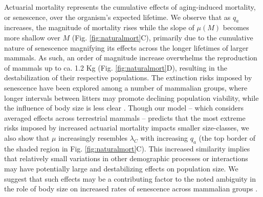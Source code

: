 \documentclass[11pt]{article}
\begin{document}
Actuarial mortality represents the cumulative effects of aging-induced mortality, or senescence, over the organism's expected lifetime. 
We observe that as $q_a$ increases, the magnitude of mortality rises while the slope of $\mu(M)$ becomes more shallow over $M$ (Fig. \ref{fig:naturalmort}C), primarily due to the cumulative nature of senescence magnifying its effects across the longer lifetimes of larger mammals.
As such, an order of magnitude increase overwhelms the reproduction of mammals up to ca. 1.2 Kg (Fig. \ref{fig:naturalmort}D), resulting in the destabilization of their respective populations. 
The extinction risks imposed by senescence have been explored among a number of mammalian groups, where longer intervals between litters may promote declining population viability, while the influence of body size is less clear \citep{robert2015actuarial}.
Though our model -- which considers averaged effects across terrestrial mammals -- predicts that the most extreme risks imposed by increased actuarial mortality impacts smaller size-classes, we also show that $\mu$ increasingly resembles $\lambda_C$ with increasing $q_a$ (the top border of the shaded region in Fig. \ref{fig:naturalmort}C).
This increased similarity implies that relatively small variations in other demographic processes or interactions may have potentially large and destabilizing effects on population size.
We suggest that such effects may be a contributing factor to the noted ambiguity in the role of body size on increased rates of senescence across mammalian groups \citep{robert2015actuarial}.


\end{document}
